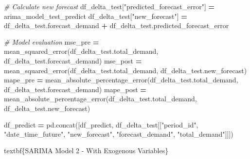 \documentclass[mstat,12pt]{unswthesis}
\newenvironment{Shaded}{\begin{snugshade}}{\end{snugshade}}
\newcommand{\CommentTok}[1]{\textcolor[rgb]{0.56,0.35,0.01}{\textit{#1}}}
\newcommand{\NormalTok}[1]{#1}
\newcommand{\OperatorTok}[1]{\textcolor[rgb]{0.81,0.36,0.00}{\textbf{#1}}}
\newcommand{\StringTok}[1]{\textcolor[rgb]{0.31,0.60,0.02}{#1}}
\begin{document}
\begin{Shaded}
\begin{Highlighting}[]
    \CommentTok{\# Calculate new forecast}
\NormalTok{    df\_delta\_test[}\StringTok{"predicted\_forecast\_error"}\NormalTok{] }\OperatorTok{=}\NormalTok{ arima\_model\_test\_predict}
\NormalTok{    df\_delta\_test[}\StringTok{"new\_forecast"}\NormalTok{] }\OperatorTok{=}\NormalTok{ df\_delta\_test.forecast\_demand }\OperatorTok{+} 
\NormalTok{        df\_delta\_test.predicted\_forecast\_error}

    \CommentTok{\# Model evaluation}
\NormalTok{    mse\_pre }\OperatorTok{=}\NormalTok{ mean\_squared\_error(df\_delta\_test.total\_demand,}
\NormalTok{        df\_delta\_test.forecast\_demand)}
\NormalTok{    mse\_post }\OperatorTok{=}\NormalTok{ mean\_squared\_error(df\_delta\_test.total\_demand,}
\NormalTok{        df\_delta\_test.new\_forecast)}
\NormalTok{    mape\_pre }\OperatorTok{=}\NormalTok{ mean\_absolute\_percentage\_error(df\_delta\_test.total\_demand,}
\NormalTok{        df\_delta\_test.forecast\_demand)}
\NormalTok{    mape\_post }\OperatorTok{=}\NormalTok{ mean\_absolute\_percentage\_error(df\_delta\_test.total\_demand,}
\NormalTok{        df\_delta\_test.new\_forecast)}

\NormalTok{    df\_predict }\OperatorTok{=}\NormalTok{ pd.concat([df\_predict, df\_delta\_test[[}\StringTok{"period\_id"}\NormalTok{, }
        \StringTok{"date\_time\_future"}\NormalTok{, }\StringTok{"new\_forecast"}\NormalTok{, }\StringTok{"forecast\_demand"}\NormalTok{, }
        \StringTok{"total\_demand"}\NormalTok{]]])}
\end{Highlighting}
\end{Shaded}

\noindent textbf\{SARIMA Model 2 - With Exogenous Variables\}
\end{document}
